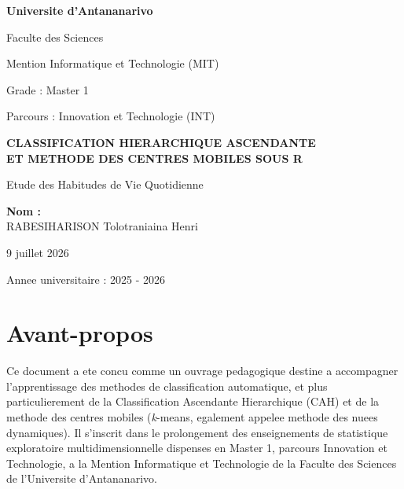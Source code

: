 \documentclass[12pt,a4paper]{book}
\newcommand{\kmeans}{\textit{k}-means}
\begin{document}
	
	\begin{titlepage}
		\begin{center}
			\vspace*{1cm}
			
			\Large
			\textbf{Universite d'Antananarivo}
			
			\vspace{0.5cm}
			\Large
			Faculte des Sciences
			
			\vspace{0.5cm}
			\large
			Mention Informatique et Technologie (MIT)
			
			\vspace{0.3cm}
			\large
			Grade : Master 1
			
			\vspace{0.3cm}
			\large
			Parcours : Innovation et Technologie (INT)
			
			\vspace{2cm}
			
			\Huge
			\textbf{CLASSIFICATION HIERARCHIQUE ASCENDANTE\\
				ET METHODE DES CENTRES MOBILES SOUS R}
			
			\vspace{0.5cm}
			\Large
			Etude des Habitudes de Vie Quotidienne
			
			\vspace{2cm}
			
			\large
			\textbf{Nom :}\\
			RABESIHARISON Tolotraniaina Henri
			
			\vspace{1cm}
			
			\large
			9 juillet 2026
			
			\vspace{0.5cm}
			\large
			Annee universitaire : 2025 - 2026
			
		\end{center}
	\end{titlepage}
	
	\tableofcontents
	\newpage
	
	\chapter*{Avant-propos}
	
	Ce document a ete concu comme un ouvrage pedagogique destine a accompagner l'apprentissage des methodes de classification automatique, et plus particulierement de la Classification Ascendante Hierarchique (CAH) et de la methode des centres mobiles (\kmeans, egalement appelee methode des nuees dynamiques). Il s'inscrit dans le prolongement des enseignements de statistique exploratoire multidimensionnelle dispenses en Master 1, parcours Innovation et Technologie, a la Mention Informatique et Technologie de la Faculte des Sciences de l'Universite d'Antananarivo.
	
\end{document}
